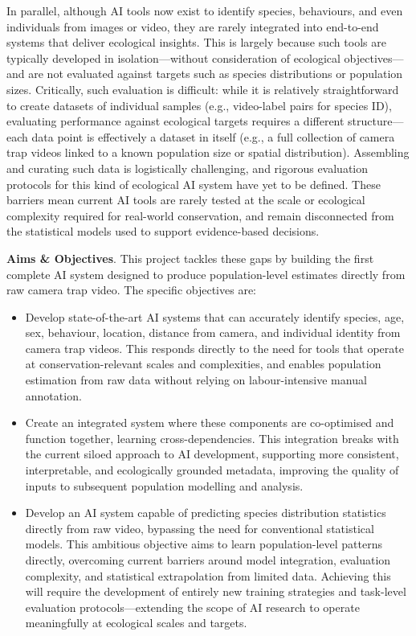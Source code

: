In parallel, although AI tools now exist to identify species, behaviours, and even individuals from images or video, they are rarely integrated into end-to-end systems that deliver ecological insights. This is largely because such tools are typically developed in isolation—without consideration of ecological objectives—and are not evaluated against targets such as species distributions or population sizes. Critically, such evaluation is difficult: while it is relatively straightforward to create datasets of individual samples (e.g., video-label pairs for species ID), evaluating performance against ecological targets requires a different structure—each data point is effectively a dataset in itself (e.g., a full collection of camera trap videos linked to a known population size or spatial distribution). Assembling and curating such data is logistically challenging, and rigorous evaluation protocols for this kind of ecological AI system have yet to be defined. These barriers mean current AI tools are rarely tested at the scale or ecological complexity required for real-world conservation, and remain disconnected from the statistical models used to support evidence-based decisions.

\textbf{Aims \& Objectives}. This project tackles these gaps by building the first complete AI system designed to produce population-level estimates directly from raw camera trap video. The specific objectives are:

\begin{itemize}
    \item Develop state-of-the-art AI systems that can accurately identify species, age, sex, behaviour, location, distance from camera, and individual identity from camera trap videos. This responds directly to the need for tools that operate at conservation-relevant scales and complexities, and enables population estimation from raw data without relying on labour-intensive manual annotation.
    \item Create an integrated system where these components are co-optimised and function together, learning cross-dependencies. This integration breaks with the current siloed approach to AI development, supporting more consistent, interpretable, and ecologically grounded metadata, improving the quality of inputs to subsequent population modelling and analysis.
    \item Develop an AI system capable of predicting species distribution statistics directly from raw video, bypassing the need for conventional statistical models. This ambitious objective aims to learn population-level patterns directly, overcoming current barriers around model integration, evaluation complexity, and statistical extrapolation from limited data. Achieving this will require the development of entirely new training strategies and task-level evaluation protocols—extending the scope of AI research to operate meaningfully at ecological scales and targets.
\end{itemize}

